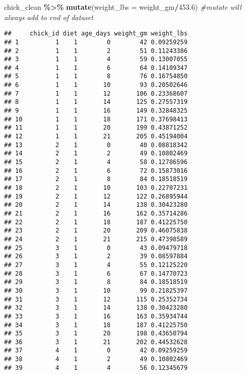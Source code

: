\documentclass[
]{article}
\newenvironment{Shaded}{\begin{snugshade}}{\end{snugshade}}
\newcommand{\AttributeTok}[1]{\textcolor[rgb]{0.13,0.29,0.53}{#1}}
\newcommand{\CommentTok}[1]{\textcolor[rgb]{0.56,0.35,0.01}{\textit{#1}}}
\newcommand{\FloatTok}[1]{\textcolor[rgb]{0.00,0.00,0.81}{#1}}
\newcommand{\FunctionTok}[1]{\textcolor[rgb]{0.13,0.29,0.53}{\textbf{#1}}}
\newcommand{\NormalTok}[1]{#1}
\newcommand{\SpecialCharTok}[1]{\textcolor[rgb]{0.81,0.36,0.00}{\textbf{#1}}}
\begin{document}
\begin{Shaded}
\begin{Highlighting}[]
\NormalTok{chick\_clean }\SpecialCharTok{\%\textgreater{}\%}
  \FunctionTok{mutate}\NormalTok{(}\AttributeTok{weight\_lbs =}\NormalTok{ weight\_gm}\SpecialCharTok{/}\FloatTok{453.6}\NormalTok{) }\CommentTok{\#mutate will always add to end of dataset }
\end{Highlighting}
\end{Shaded}

\begin{verbatim}
##     chick_id diet age_days weight_gm weight_lbs
## 1          1    1        0        42 0.09259259
## 2          1    1        2        51 0.11243386
## 3          1    1        4        59 0.13007055
## 4          1    1        6        64 0.14109347
## 5          1    1        8        76 0.16754850
## 6          1    1       10        93 0.20502646
## 7          1    1       12       106 0.23368607
## 8          1    1       14       125 0.27557319
## 9          1    1       16       149 0.32848325
## 10         1    1       18       171 0.37698413
## 11         1    1       20       199 0.43871252
## 12         1    1       21       205 0.45194004
## 13         2    1        0        40 0.08818342
## 14         2    1        2        49 0.10802469
## 15         2    1        4        58 0.12786596
## 16         2    1        6        72 0.15873016
## 17         2    1        8        84 0.18518519
## 18         2    1       10       103 0.22707231
## 19         2    1       12       122 0.26895944
## 20         2    1       14       138 0.30423280
## 21         2    1       16       162 0.35714286
## 22         2    1       18       187 0.41225750
## 23         2    1       20       209 0.46075838
## 24         2    1       21       215 0.47398589
## 25         3    1        0        43 0.09479718
## 26         3    1        2        39 0.08597884
## 27         3    1        4        55 0.12125220
## 28         3    1        6        67 0.14770723
## 29         3    1        8        84 0.18518519
## 30         3    1       10        99 0.21825397
## 31         3    1       12       115 0.25352734
## 32         3    1       14       138 0.30423280
## 33         3    1       16       163 0.35934744
## 34         3    1       18       187 0.41225750
## 35         3    1       20       198 0.43650794
## 36         3    1       21       202 0.44532628
## 37         4    1        0        42 0.09259259
## 38         4    1        2        49 0.10802469
## 39         4    1        4        56 0.12345679

\end{verbatim}
\end{document}
